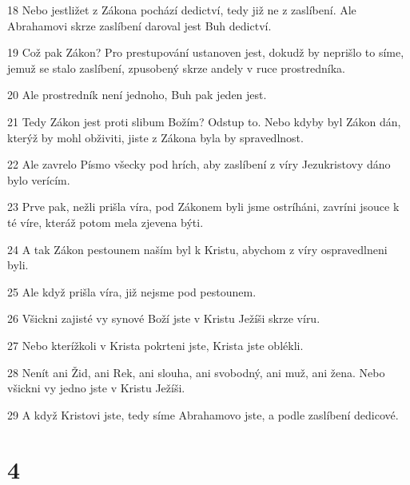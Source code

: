 \par 18 Nebo jestližet z Zákona pochází dedictví, tedy již ne z zaslíbení. Ale Abrahamovi skrze zaslíbení daroval jest Buh dedictví.
\par 19 Což pak Zákon? Pro prestupování ustanoven jest, dokudž by neprišlo to síme, jemuž se stalo zaslíbení, zpusobený skrze andely v ruce prostredníka.
\par 20 Ale prostredník není jednoho, Buh pak jeden jest.
\par 21 Tedy Zákon jest proti slibum Božím? Odstup to. Nebo kdyby byl Zákon dán, kterýž by mohl obživiti, jiste z Zákona byla by spravedlnost.
\par 22 Ale zavrelo Písmo všecky pod hrích, aby zaslíbení z víry Jezukristovy dáno bylo verícím.
\par 23 Prve pak, nežli prišla víra, pod Zákonem byli jsme ostríháni, zavríni jsouce k té víre, kteráž potom mela zjevena býti.
\par 24 A tak Zákon pestounem naším byl k Kristu, abychom z víry ospravedlneni byli.
\par 25 Ale když prišla víra, již nejsme pod pestounem.
\par 26 Všickni zajisté vy synové Boží jste v Kristu Ježíši skrze víru.
\par 27 Nebo kterížkoli v Krista pokrteni jste, Krista jste oblékli.
\par 28 Nenít ani Žid, ani Rek, ani slouha, ani svobodný, ani muž, ani žena. Nebo všickni vy jedno jste v Kristu Ježíši.
\par 29 A když Kristovi jste, tedy síme Abrahamovo jste, a podle zaslíbení dedicové.

\chapter{4}

